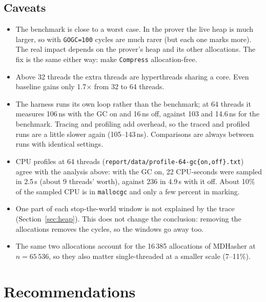 \documentclass[10pt,a4paper]{article}
\begin{document}
\subsection{Caveats}
\begin{itemize}
  \item The benchmark is close to a worst case. In the prover the live heap is much larger,
    so with \texttt{GOGC=100} cycles are much rarer (but each one marks more). The real
    impact depends on the prover's heap and its other allocations. The fix is the same
    either way: make \texttt{Compress} allocation-free.
  \item Above 32 threads the extra threads are hyperthreads sharing a core. Even baseline
    gains only 1.7$\times$ from 32 to 64 threads.
  \item The harness runs its own loop rather than the benchmark; at 64 threads it measures
    106\,ns with the GC on and 16\,ns off, against 103 and 14.6\,ns for the benchmark.
    Tracing and profiling add overhead, so the traced and profiled runs are a little slower
    again (105--143\,ns). Comparisons are always between runs with identical settings.
  \item CPU profiles at 64 threads (\texttt{report/data/profile-64-gc\{on,off\}.txt}) agree
    with the analysis above: with the GC on, 22 CPU-seconds were sampled in 2.5\,s (about
    9 threads' worth), against 236 in 4.9\,s with it off. About 10\% of the sampled CPU is
    in \texttt{mallocgc} and only a few percent in marking.
  \item One part of each stop-the-world window is not explained by the trace
    (Section~\ref{sec:heap}). This does not change the conclusion: removing the allocations
    removes the cycles, so the windows go away too.
  \item The same two allocations account for the 16\,385 allocations of MDHasher at
    $n=65\,536$, so they also matter single-threaded at a smaller scale (7--11\%).
\end{itemize}

\section{Recommendations}
\end{document}
